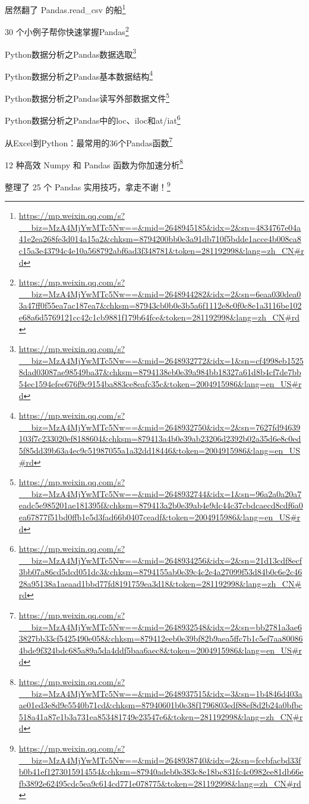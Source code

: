 \documentclass[]{ctexbook}
\renewcommand{\href}[2]{#2\footnote{\url{#1}}}
\begin{document}
\href{https://mp.weixin.qq.com/s?__biz=MzA4MjYwMTc5Nw==\&mid=2648945185\&idx=2\&sn=4834767e04a41e2ea268fe3d014a15a2\&chksm=8794200bb0e3a91db710f5bdde1acce4b008ca8c15a3e43794c4e10a568792abf6ad3f348781\&token=281192998\&lang=zh_CN\#rd}{居然翻了 Pandas.read\_csv 的船}

\href{https://mp.weixin.qq.com/s?__biz=MzA4MjYwMTc5Nw==\&mid=2648944282\&idx=2\&sn=6eaa030dea03a47ff0f55ea7ac187ea7\&chksm=87943cb0b0e3b5a6f1112e8c0f0c8e1a3116be102e68a6d5769121cc42c1cb9881f179b64fce\&token=281192998\&lang=zh_CN\#rd}{30 个小例子帮你快速掌握Pandas}

\href{https://mp.weixin.qq.com/s?__biz=MzA4MjYwMTc5Nw==\&mid=2648932772\&idx=1\&sn=cf4998eb15258dad03087ae98549ba37\&chksm=8794138eb0e39a984bb18327a61d8b4cf7de7bb54ec1594efee676f9c9154ba883ce8eafc35c\&token=2004915986\&lang=en_US\#rd}{Python数据分析之Pandas数据选取}

\href{https://mp.weixin.qq.com/s?__biz=MzA4MjYwMTc5Nw==\&mid=2648932750\&idx=2\&sn=7627fd94639103f7c233020ef8188604\&chksm=879413a4b0e39ab23206d2392b02a35d6e8c0ed5f85dd39b63a4ec9c51987055a1a32dd18446\&token=2004915986\&lang=en_US\#rd}{Python数据分析之Pandas基本数据结构}

\href{https://mp.weixin.qq.com/s?__biz=MzA4MjYwMTc5Nw==\&mid=2648932744\&idx=1\&sn=96a2a0a20a7eadc5e985201ae181395f\&chksm=879413a2b0e39ab4e9dc44c37cbdcaecd8cdf6a0ea67877f51bd0ffb1e5d3fad66b0407ceadf\&token=2004915986\&lang=en_US\#rd}{Python数据分析之Pandas读写外部数据文件}

\href{https://mp.weixin.qq.com/s?__biz=MzA4MjYwMTc5Nw==\&mid=2648934256\&idx=2\&sn=21d13cdf8ecf3bb07a86cd5dcd051dc3\&chksm=8794155ab0e39c4c2e4a27099f53d84b0c6e2c4628a95138a1aeaad1bbd77fd8191759ea3d18\&token=281192998\&lang=zh_CN\#rd}{Python数据分析之Pandas中的loc、iloc和at/iat}

\href{https://mp.weixin.qq.com/s?__biz=MzA4MjYwMTc5Nw==\&mid=2648932548\&idx=2\&sn=bb2781a3ae63827bb33cf5425490e058\&chksm=879412eeb0e39bf82b9aea5ffc7b1c5ef7aa800864bde9f324bdc685a89a5da4ddf5baa6aec8\&token=2004915986\&lang=en_US\#rd}{从Excel到Python：最常用的36个Pandas函数}

\href{https://mp.weixin.qq.com/s?__biz=MzA4MjYwMTc5Nw==\&mid=2648937515\&idx=3\&sn=1b4846d403aae01ed3e8d9e5540b71cd\&chksm=87940601b0e38f1796803edf88ef8d2b24a0bfbc518a41a87e1b3a731ea853481749e23547e6\&token=281192998\&lang=zh_CN\#rd}{12 种高效 Numpy 和 Pandas 函数为你加速分析}

\href{https://mp.weixin.qq.com/s?__biz=MzA4MjYwMTc5Nw==\&mid=2648938740\&idx=2\&sn=fccbfacbd33fb0b41ef1273015914554\&chksm=87940adeb0e383c8e18bc831fc4c0982ee81db66efb3892e62495cdc5ea9c614cd771e078775\&token=281192998\&lang=zh_CN\#rd}{整理了 25 个 Pandas 实用技巧，拿走不谢！}
\end{document}
